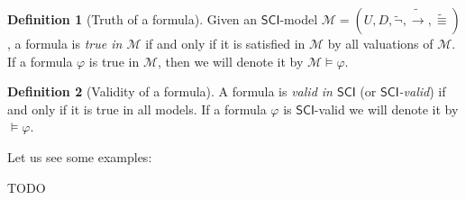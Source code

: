 \documentclass{article}
\theoremstyle{definition}
\newtheorem{definition}{Definition}[section]
\theoremstyle{definition}
\newcommand*{\id}{\equiv}
\newcommand*{\ra}{\rightarrow}
\newcommand{\SCI}{$\mathsf{SCI}$\xspace}
\begin{document}
\begin{definition}[Truth of a formula]
    Given an \SCI-model $\mathcal{M} = (U, D, \tilde{\lnot}, \tilde{\ra}, \tilde{\id})$, a formula is \emph{true in $\mathcal{M}$} if and only if it is satisfied in $\mathcal{M}$ by all valuations of $\mathcal{M}$. If a formula $\varphi$ is true in $\mathcal{M}$, then we will denote it by $\mathcal{M} \models \varphi$.
\end{definition}

\begin{definition}[Validity of a formula]
    A formula is \emph{valid in \SCI} (or \emph{\SCI-valid}) if and only if it is true in all models. If a formula $\varphi$ is \SCI-valid we will denote it by $ \models \varphi$.
\end{definition}

Let us see some examples:

TODO
\end{document}

